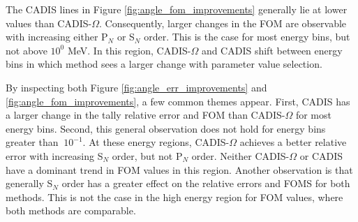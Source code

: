 The CADIS lines in Figure \ref{fig:angle_fom_improvements} generally lie at
lower values than CADIS-$\Omega$. Consequently, larger changes in the FOM are
observable with increasing either P$_N$ or S$_N$ order. This is the case for
most energy bins, but not above $10^0$ MeV. In this region, CADIS-$\Omega$ and
CADIS shift between energy bins in which method sees
a larger change with parameter value selection.

By inspecting both Figure \ref{fig:angle_err_improvements} and
\ref{fig:angle_fom_improvements}, a few common themes appear. First, CADIS has a
larger change in the tally relative error and FOM than CADIS-$\Omega$ for most
energy bins. Second, this general observation does not hold for energy bins
greater than $~10^{-1}$. At these energy regions, CADIS-$\Omega$ achieves a
better relative error with increasing S$_N$ order, but not P$_N$ order. Neither
CADIS-$\Omega$ or CADIS have a dominant trend in FOM values in this region.
Another observation is that generally S$_N$ order has a greater effect on the
relative errors and FOMS for both methods. This is not the case in the high
energy region for FOM values, where both methods are comparable.

